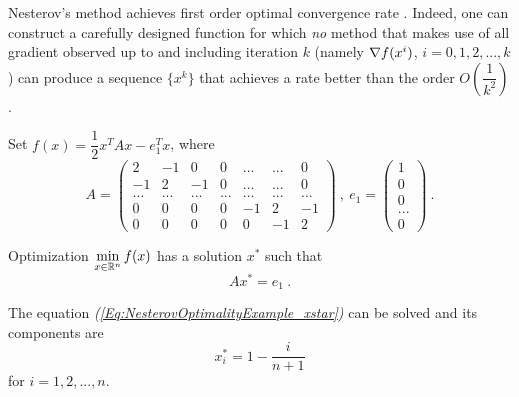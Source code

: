 Nesterov's method achieves first order optimal convergence rate \cite{NesterovBook}. Indeed, one can construct a carefully designed function for which \textit{no} method that makes use of all gradient observed up to and including iteration $k$ (namely $\nabla f(x^i)$, $i=0,1,2,...,k$) can produce a sequence $\{x^k\}$ that achieves a rate better than the order $O\left(\dfrac{1}{k^2}\right)$.

Set $f(x)=\dfrac{1}{2}x^TAx-e_1^Tx$, where
$$A=\begin{pmatrix}
2&-1&0&0&...&...&0
\\
-1&2&-1&0&...&...&0
\\
...&...&...&...&...&...&...
\\
0&0&0&0&-1&2&-1
\\
0&0&0&0&0&-1&2
\end{pmatrix} \ , \
e_1=\begin{pmatrix}1\\0\\0\\...\\0\end{pmatrix} \ .$$

Optimization $\min\limits_{x\in \mathbb R^n}f(x)$ has a solution $x^*$ such that 
\begin{equation}\label{Eq:NesterovOptimalityExample_xstar}
Ax^*=e_1 \ .
\end{equation} 

\begin{lemma}\label{Lm:NesterovOptimalityExampleSolutionOfx_star}
The equation \emph{(\ref{Eq:NesterovOptimalityExample_xstar})} can be solved and its components are $$x_i^*=1-\dfrac{i}{n+1}$$ for $i=1,2,...,n$.
\end{lemma}

